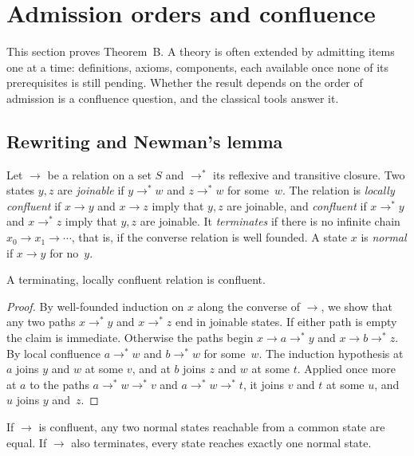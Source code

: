 \section{Admission orders and confluence}
\label{sec:admission}

This section proves Theorem~B. A theory is often extended by admitting items one at a
time: definitions, axioms, components, each available once none of its prerequisites is still
pending.
Whether the result depends on the order of admission is a confluence question, and the
classical tools answer it.

\subsection{Rewriting and Newman's lemma}

\begin{definition}
\label{def:rewriting}
Let $\to$ be a relation on a set $S$ and $\to^{*}$ its reflexive and transitive closure.
Two states $y,z$ are \emph{joinable} if $y\to^{*}w$ and $z\to^{*}w$ for some~$w$. The
relation is \emph{locally confluent} if $x\to y$ and $x\to z$ imply that $y,z$ are
joinable, and \emph{confluent} if $x\to^{*}y$ and $x\to^{*}z$ imply that $y,z$ are
joinable. It \emph{terminates} if there is no infinite chain $x_0\to x_1\to\cdots$, that
is, if the converse relation is well founded. A state $x$ is \emph{normal} if $x\to y$
for no~$y$.
\end{definition}

\begin{theorem}
\label{thm:newman}
A terminating, locally confluent relation is confluent.
\end{theorem}

\begin{proof}
By well-founded induction on $x$ along the converse of $\to$, we show that any two paths
$x\to^{*}y$ and $x\to^{*}z$ end in joinable states. If either path is empty the claim is
immediate. Otherwise the paths begin $x\to a\to^{*}y$ and $x\to b\to^{*}z$. By local
confluence $a\to^{*}w$ and $b\to^{*}w$ for some~$w$. The induction hypothesis at $a$
joins $y$ and $w$ at some $v$, and at $b$ joins $z$ and $w$ at some $t$. Applied once more
at $a$ to the paths $a\to^{*}w\to^{*}v$ and $a\to^{*}w\to^{*}t$, it joins $v$ and $t$ at
some $u$, and $u$ joins $y$ and~$z$.
\end{proof}

\begin{corollary}
\label{cor:normal-forms}
If $\to$ is confluent, any two normal states reachable from a common state are equal. If
$\to$ also terminates, every state reaches exactly one normal state.
\end{corollary}

